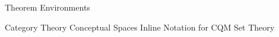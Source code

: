 
		
		
	\newcommand{\definition}[1]{\ensuremath{#1}\xspace}



	{Theorem Environments} %
		
	\newcommand{\emptyArg}{\,\underline{\hspace{6px}}\,} %
	\newcommand{\inlineQuote}[1]{\textquotedblleft #1\textquotedblright} %
	\newcommand{\TODO}{\textbf{[TODO]}} %
	\newcommand{\citeTODO}[1]{\textbf{[#1]}} %


	\newcommand{\iffdef}{\stackrel{def}{\iff}} %
	\newcommand{\iffdeftemp}{\stackrel{\Delta}{\iff}} %
	\newcommand{\eqdef}{:=} %
	\newcommand{\eqdeftemp}{\stackrel{\Delta}{=}} %
	\newcommand{\imply}{\Rightarrow} %

	\newcommand{\turnstyle}{\models} %



{Category Theory}
{Conceptual Spaces}
{Inline Notation for CQM}
{Set Theory}
